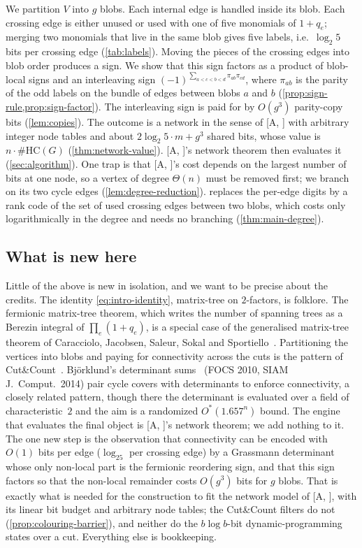 \documentclass[11pt]{amsart}
\theoremstyle{plain}
\theoremstyle{definition}
\theoremstyle{remark}
\numberwithin{equation}{section}
\newcommand{\HC}{\#\mathrm{HC}}
\newcommand{\A}[1][]{\textup{[A\if\relax\detokenize{#1}\relax\else, #1\fi]}}
\begin{document}
We partition $V$ into $g$ blobs. Each internal edge is handled inside its blob. Each crossing
edge is either unused or used with one of five monomials of $1+q_e$; merging two monomials that
live in the same blob gives five labels, i.e.\ $\log_2 5$ bits per crossing edge
(\cref{tab:labels}). Moving the pieces of the crossing edges into blob order produces a sign. We
show that this sign factors as a product of blob-local signs and an interleaving sign
$(-1)^{\sum_{a<c<b<d}\pi_{ab}\pi_{cd}}$, where $\pi_{ab}$ is the parity of the odd labels on the
bundle of edges between blobs $a$ and $b$ (\cref{prop:sign-rule,prop:sign-factor}). The
interleaving sign is paid for by $O(g^3)$ parity-copy bits (\cref{lem:copies}). The outcome is a
network in the sense of \A{} with arbitrary integer node tables and about $2\log_2 5\cdot m+g^3$
shared bits, whose value is $n\cdot\HC(G)$ (\cref{thm:network-value}). \A's network theorem then
evaluates it (\cref{sec:algorithm}). One trap is that \A's cost depends on the largest number of
bits at one node, so a vertex of degree $\Theta(n)$ must be removed first; we branch on its two
cycle edges (\cref{lem:degree-reduction}).  replaces the per-edge digits by a
rank code of the set of used crossing edges between two blobs, which costs only logarithmically in
the degree and needs no branching (\cref{thm:main-degree}).

\subsection{What is new here}
Little of the above is new in isolation, and we want to be precise about the credits. The
identity \eqref{eq:intro-identity}, matrix-tree on $2$-factors, is folklore. The fermionic
matrix-tree theorem, which writes the number of spanning trees as a Berezin integral of
$\prod_e(1+q_e)$, is a special case of the generalised matrix-tree theorem of Caracciolo,
Jacobsen, Saleur, Sokal and Sportiello~\cite{CJSSS04}.
Partitioning the vertices into blobs and paying for connectivity across the cuts is the pattern
of Cut\&Count~\cite{CutAndCount11}. Björklund's determinant sums~\cite{Bjorklund14} (FOCS 2010,
SIAM J.\ Comput.\ 2014) pair cycle covers with determinants to enforce connectivity, a closely
related pattern, though there the determinant is evaluated over a field of characteristic~$2$
and the aim is a randomized $O^*(1.657^n)$ bound. The engine that evaluates the final object is
\A's network theorem; we add nothing to it. The one new step is the observation that
connectivity can be encoded with $O(1)$ bits per edge ($\log_25$ per crossing edge) by a
Grassmann determinant whose only non-local part is the fermionic reordering sign, and that this
sign factors so that the non-local remainder costs $O(g^3)$ bits for $g$ blobs. That is exactly
what is needed for the construction to fit the network model of \A, with its linear bit budget
and arbitrary node tables; the Cut\&Count filters do not (\cref{prop:colouring-barrier}), and
neither do the $b\log b$-bit dynamic-programming states over a cut. Everything else is
bookkeeping.
\end{document}
